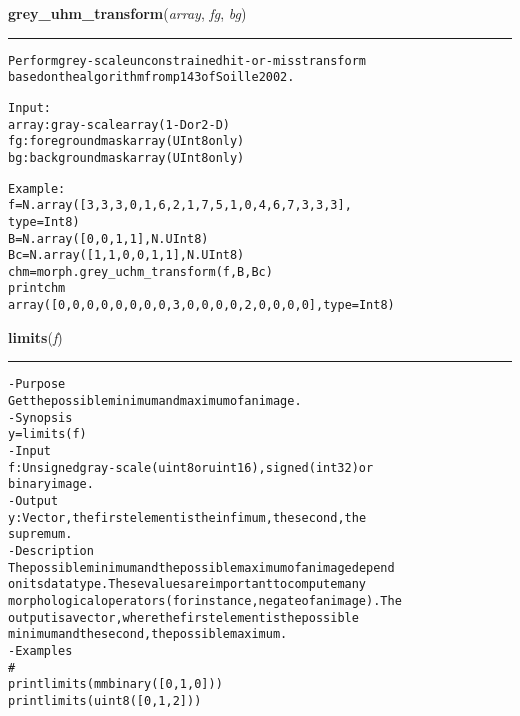     \label{multireg:morph:grey_uhm_transform}
    \vspace{0.5ex}

    \begin{boxedminipage}{\textwidth}

    \raggedright \textbf{grey\_uhm\_transform}(\textit{array}, \textit{fg}, \textit{bg})

    \vspace{-1.5ex}

    \rule{\textwidth}{0.5\fboxrule}
\begin{alltt}
Perform grey-scale unconstrained hit-or-miss transform
based on the algorithm from p 143 of Soille 2002.

Input:
   array: gray-scale array (1-D or 2-D)
   fg   : foreground mask array (UInt8 only)
   bg   : background mask array (UInt8 only)

 Example:
   f = N.array([3, 3, 3, 0, 1, 6, 2, 1, 7, 5, 1, 0, 4, 6, 7, 3, 3, 3], 
               type=Int8)
   B = N.array([0,0,1,1],N.UInt8)
   Bc = N.array([1,1,0,0,1,1],N.UInt8)
   chm = morph.grey\_uchm\_transform(f,B,Bc)
   print chm
   array([0, 0, 0, 0, 0, 0, 0, 0, 3, 0, 0, 0, 0, 2, 0, 0, 0, 0], type=Int8)\end{alltt}

    \vspace{1ex}

    \end{boxedminipage}

    \label{multireg:morph:limits}
    \vspace{0.5ex}

    \begin{boxedminipage}{\textwidth}

    \raggedright \textbf{limits}(\textit{f})

    \vspace{-1.5ex}

    \rule{\textwidth}{0.5\fboxrule}
\begin{alltt}
- Purpose
    Get the possible minimum and maximum of an image.
- Synopsis
    y = limits(f)
- Input
    f: Unsigned gray-scale (uint8 or uint16), signed (int32) or
       binary image.
- Output
    y: Vector, the first element is the infimum, the second, the
       supremum.
- Description
    The possible minimum and the possible maximum of an image depend
    on its data type. These values are important to compute many
    morphological operators (for instance, negate of an image). The
    output is a vector, where the first element is the possible
    minimum and the second, the possible maximum.
- Examples
    \#
    print limits(mmbinary([0, 1, 0]))
    print limits(uint8([0, 1, 2]))\end{alltt}

    \vspace{1ex}

    \end{boxedminipage}

